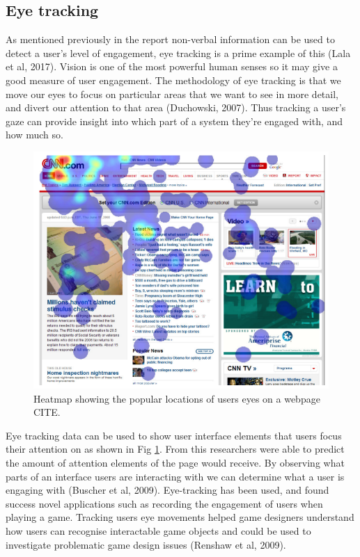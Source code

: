 \documentclass{article}
\begin{document}
\subsection{Eye tracking}

As mentioned previously in the report non-verbal information can be used to detect a
user’s level of engagement, eye tracking is a prime example of this (Lala et al, 2017).
Vision is one of the most powerful human senses so it may give a good measure of user engagement. 
The methodology of eye tracking is that we move our eyes to focus on particular areas that we want to see in more detail, and divert our attention to that area (Duchowski, 2007). 
Thus tracking a user’s gaze can provide insight into which part of a system they’re engaged with, and how much so.

\begin{figure}[ht]
    \centering
    \centerline{
        \includegraphics[scale=1]{EyeHeatmap.PNG}
    }
    \caption{Heatmap showing the popular locations of users eyes on a webpage CITE.}
    \label{fig:eyetrack}
\end{figure}

Eye tracking data can be used to show user interface elements that users focus their attention on as shown in Fig \ref{fig:eyetrack}. 
From this researchers were able to predict the amount of attention elements of the page would receive. 
By observing what parts of an interface users are interacting with we can determine what a user is engaging with (Buscher et al, 2009).
Eye-tracking has been used, and found success novel applications such as recording the engagement of users when playing a game. 
Tracking users eye movements helped game designers understand how users can recognise interactable game objects and could be used to investigate problematic game design issues (Renshaw et al, 2009).
\end{document}
